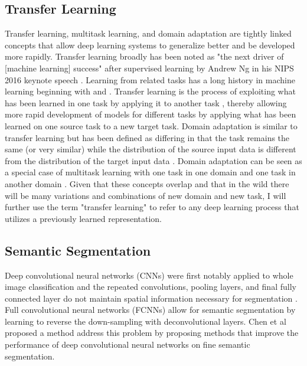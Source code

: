 \documentclass[10pt,twocolumn,letterpaper]{article}
\begin{document}
\subsection{Transfer Learning}
Transfer learning, multitask learning, and domain adaptation are tightly linked
concepts that allow deep learning systems to generalize better and be developed more rapidly.
Transfer learning broadly has been noted as "the next driver of [machine learning] success" after supervised learning by Andrew Ng in his NIPS 2016 keynote speech \cite{ng2016nips}. Learning from related tasks has a long history in machine learning beginning with \citet{thrun1996learning} and \citet{caruana1997multitask} \cite{donahue2014decaf}.
Transfer learning is the process of exploiting what has been learned in one task by applying it to another task \cite[chap. 15]{goodfellow2016deep}, thereby allowing
more rapid development of models for different tasks by applying what has been learned on one source task to a new target task. Domain adaptation is
similar to transfer learning but has been defined as differing in that the task remains the same (or very similar) while
the distribution of the source input data is different from the distribution of the target input data \cite[chap. 15]{goodfellow2016deep}. Domain adaptation can
be seen as a special case of multitask learning with one task in one domain and one task in another domain \cite{patel2015visual}. Given that these concepts overlap and that
in the wild there will be many variations and combinations of new domain and new task, I will further use the term "transfer learning" to refer to any deep learning process that utilizes
a previously learned representation.


\subsection{Semantic Segmentation}
Deep convolutional neural networks (CNNs) were first notably applied to whole image classification and the repeated convolutions, pooling layers, and final fully connected layer do not maintain spatial information necessary for segmentation \cite{marmanis2016semantic}.
Full convolutional neural networks (FCNNs) allow for semantic segmentation by learning to reverse the down-sampling with deconvolutional layers.
Chen et al proposed a method \cite{chen2018deeplab} address this problem by proposing methods that improve the performance of
deep convolutional neural networks on fine semantic segmentation.
\end{document}
